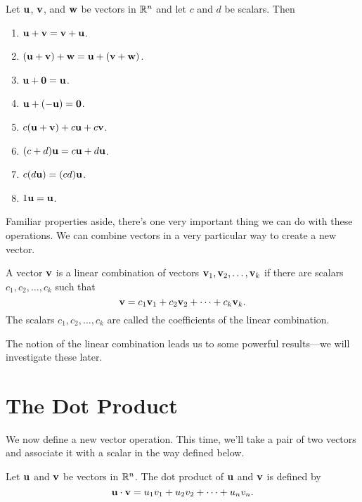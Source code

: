 \documentclass[../m73main.tex]{chapters}
\begin{document}
\begin{theorem}
	Let $\mathbf{u}$, $\mathbf{v}$, and $\mathbf{w}$ be vectors in $\mathbb{R}^n$ and let $c$ and $d$ be scalars.
	Then
	\begin{enumerate}[label=(\alph*)]
		\item $\mathbf{u} + \mathbf{v} = \mathbf{v} + \mathbf{u}$.
		\item $(\mathbf{u} + \mathbf{v}) + \mathbf{w} = \mathbf{u} + (\mathbf{v} + \mathbf{w})$.
		\item $\mathbf{u} + \mathbf{0} = \mathbf{u}$.
		\item $\mathbf{u} + (-\mathbf{u}) = \mathbf{0}$.
		\item $c(\mathbf{u} + \mathbf{v}) + c \mathbf{u} + c \mathbf{v}$.
		\item $(c + d) \mathbf{u} = c \mathbf{u} + d \mathbf{u}$.
		\item $c(d \mathbf{u}) = (cd) \mathbf{u}$.
		\item $1 \mathbf{u} = \mathbf{u}$.
	\end{enumerate}
\end{theorem}

Familiar properties aside, there's one very important thing we can do with these operations.
We can combine vectors in a very particular way to create a new vector.

\begin{definition}
	A vector $\mathbf{v}$ is a linear combination of vectors $\mathbf{v}_1, \mathbf{v}_2, \ldots, \mathbf{v}_k$ if there are scalars $c_1, c_2, \ldots, c_k$ such that
	\[ \mathbf{v} = c_1 \mathbf{v}_1 + c_2 \mathbf{v}_2 + \cdots + c_k \mathbf{v}_k. \]
	The scalars $c_1, c_2, \ldots, c_k$ are called the coefficients of the linear combination.
\end{definition}

The notion of the linear combination leads us to some powerful results---we will investigate these later.

\section{The Dot Product}
We now define a new vector operation.
This time, we'll take a pair of two vectors and associate it with a scalar in the way defined below.

\begin{definition}
	Let $\mathbf{u}$ and $\mathbf{v}$ be vectors in $\mathbb{R}^n$.
	The dot product of $\mathbf{u}$ and $\mathbf{v}$ is defined by
	\[ \mathbf{u} \cdot \mathbf{v} = u_1 v_1 + u_2 v_2 + \cdots + u_n v_n. \]
\end{definition}
\end{document}
